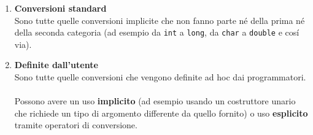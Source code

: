 \documentclass{article}
\begin{document}
\begin{enumerate}
\item \textbf{Conversioni standard}\\Sono tutte quelle conversioni implicite che non fanno parte n\'e della prima n\'e della seconda categoria (ad esempio da \texttt{int} a \texttt{long}, da \texttt{char} a \texttt{double} e cos\'i via).\\
\item \textbf{Definite dall'utente}\\Sono tutte quelle conversioni che vengono definite ad hoc dai programmatori.\\ \\Possono avere un uso \textbf{implicito} (ad esempio usando un costruttore unario che richiede un tipo di argomento differente da quello fornito) o uso \textbf{esplicito} tramite operatori di conversione.
\end{enumerate}
\end{document}
